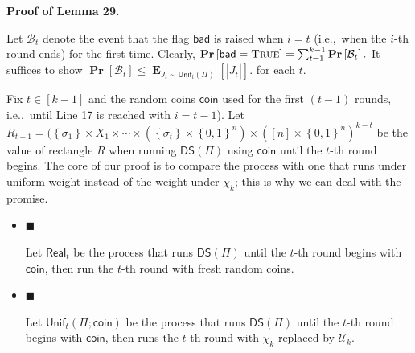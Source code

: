 \documentclass[10pt,a4paper]{article}
\begin{document}
\par\medskip\noindent\textbf{Proof of Lemma 29.}\par




Let $\mathcal{B}_{t}$ denote the event that the flag $\mathsf{bad}$ is raised when $i=t$ (i.e., when the $i$-th round ends) for the first time.
Clearly,
$\operatorname*{\mathbf{Pr}}\left[\mathsf{bad}=\textsc{True}\right]=\sum_{t=1}^{k-1}\operatorname*{\mathbf{Pr}}\left[\mathcal{B}_{t}\right].$
It suffices to show $\operatorname*{\mathbf{Pr}}\left[\mathcal{B}_{t}\right]\leq\operatorname*{\mathbf{E}}_{J_{t}\sim\mathsf{Unif}_{t}(\Pi)}\left[|\overline{J_{t}}|\right].$ for each $t$.\par




Fix $t\in[k-1]$ and the random coins $\mathsf{coin}$ used for the first $(t-1)$ rounds, i.e., until Line 17 is reached with $i=t-1$).
Let $R_{t-1}=(\left\{\sigma_{1}\right\}\times X_{1}\times\cdots\times(\left\{\sigma_{t}\right\}\times\left\{0,1\right\}^{n})\times([n]\times\left\{0,1\right\}^{n})^{k-t}$ be the value of rectangle $R$ when running $\mathsf{DS}(\Pi)$ using $\mathsf{coin}$ until the $t$-th round begins.
The core of our proof is to compare the process with one that runs under uniform weight instead of the weight under $\chi_{k}$; this is why we can deal with the promise.\par


\begin{itemize}


\item[] 
$\blacksquare$ 


Let $\mathsf{Real}_{t}$ be the process that runs $\mathsf{DS}(\Pi)$ until the $t$-th round begins with $\mathsf{coin}$, then run the $t$-th round with fresh random coins.\par





\item[] 
$\blacksquare$ 


Let $\mathsf{Unif}_{t}(\Pi;\mathsf{coin})$ be the process that
runs $\mathsf{DS}(\Pi)$ until the $t$-th round begins with $\mathsf{coin}$, then runs the $t$-th round with $\chi_{k}$ replaced by $\mathcal{U}_{k}$.\par





\end{itemize}
\end{document}
